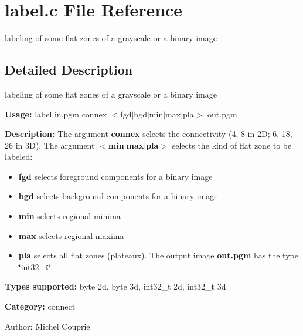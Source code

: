 \section{label.c File Reference}
\label{label_8c}
labeling of some flat zones of a grayscale or a binary image 



\subsection{Detailed Description}
labeling of some flat zones of a grayscale or a binary image 

{\bf Usage:} label in.pgm connex $<$fgd$|$bgd$|$min$|$max$|$pla$>$ out.pgm

{\bf Description:} The argument {\bf connex} selects the connectivity (4, 8 in 2D; 6, 18, 26 in 3D). The argument {\bf $<$min$|$max$|$pla$>$} selects the kind of flat zone to be labeled: \begin{itemize}
\item {\bf fgd} selects foreground components for a binary image \item {\bf bgd} selects background components for a binary image \item {\bf min} selects regional minima \item {\bf max} selects regional maxima \item {\bf pla} selects all flat zones (plateaux). The output image {\bf out.pgm} has the type \char`\"{}int32\_\-t\char`\"{}.\end{itemize}
{\bf Types supported:} byte 2d, byte 3d, int32\_\-t 2d, int32\_\-t 3d

{\bf Category:} connect

\begin{Desc}
\item[Author:]Michel Couprie \end{Desc}
